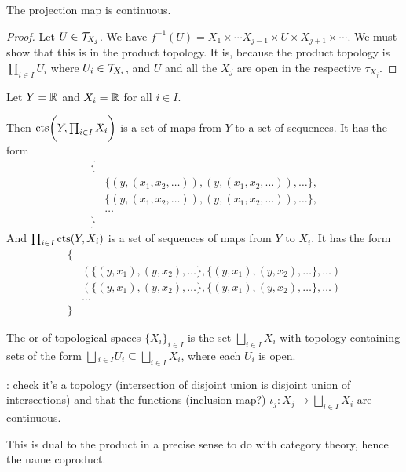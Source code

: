 \begin{claim}
  The projection map is continuous.
\end{claim}

\begin{proof}
  Let $U \in \mathcal T_{X_j}$. We
  have $f^{-1}(U) = X_1 \times \cdots X_{j-1} \times U \times X_{j+1} \times \cdots$. We must show
  that this is in the product topology. It is, because the product topology
  is $\prod_{i \in I} U_i$ where $U_i \in \mathcal T_{X_i}$, and $U$ and all the $X_j$ are open in the
  respective $\tau_{X_j}$.
\end{proof}


\begin{example}
  Let $Y = \mathbb{R}$ and $X_i = \mathbb{R}$ for all $i \in I$.

  Then $\text{cts}\bigg(Y, \prod_{i \in I} X_i\bigg)$ is a set of maps from $Y$ to a set of sequences. It has the form
  \begin{align*}
    \{& \\
      &\{(y, (x_{1}, x_{2}, \ldots)), (y, (x_{1}, x_{2}, \ldots)), \ldots\}, \\
      &\{(y, (x_{1}, x_{2}, \ldots)), (y, (x_{1}, x_{2}, \ldots)), \ldots\}, \\
      &\ldots \\
    \}&
  \end{align*}
  And $\prod_{i \in I} \text{cts}(Y, X_i)$ is a set of sequences of maps from $Y$ to $X_i$. It has the form
  \begin{align*}
    \{ \\
      &(\{(y, x_1), (y, x_2), \ldots\}, \{(y, x_1), (y, x_2), \ldots\}, \ldots) \\
      &(\{(y, x_1), (y, x_2), \ldots\}, \{(y, x_1), (y, x_2), \ldots\}, \ldots) \\
      &\ldots \\
    \}
  \end{align*}
\end{example}


\begin{definition}
  The  or  of topological spaces $\{X_i\}_{i \in I}$ is the
  set $\bigsqcup_{i \in I} X_i$ with topology containing sets of the
  form $\bigsqcup{_{i \in I}} U_i \subseteq \bigsqcup_{i \in I} X_i$, where each $U_i$ is open.

  : check it's a topology (intersection of disjoint union is disjoint union of intersections)
  and that the functions (inclusion map?) $\iota_j: X_j \to \bigsqcup_{i \in I} X_i$ are
  continuous.

  This is dual to the product in a precise sense to do with category theory, hence the name
  coproduct.
\end{definition}

